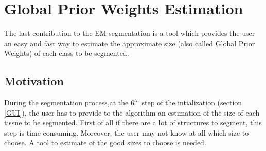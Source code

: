 \section{Global Prior Weights Estimation}\label{GPSPDGSPGS}

The last contribution to the EM segmentation is a tool which provides the user an easy and fast way to estimate the approximate size (also called Global Prior Weights) of each class to be segmented.

\subsection{Motivation}
During the segmentation process,at the $6^{th}$ step of the intialization (section \ref{GUI}), the user has to provide to the algorithm an estimation of the size of each tissue to be segmented. 
First of all if there are a lot of structures to segment, this step is time consuming. Moreover, the user may not know at all which size to choose. A tool to estimate of the good sizes to choose is needed. 
